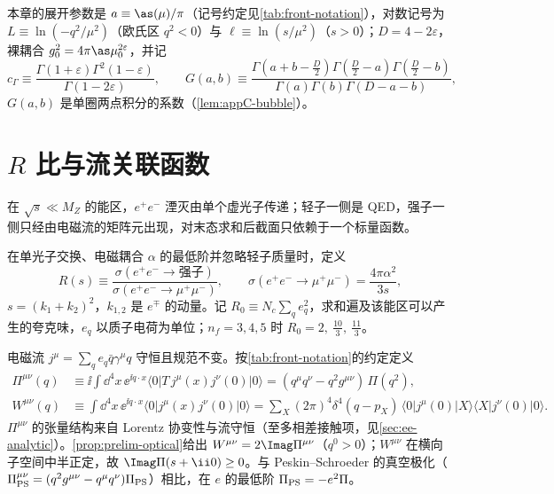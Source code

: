 本章的展开参数是 $a\equiv\as(\mu)/\pi$（记号约定见\cref{tab:front-notation}），对数记号为 $L\equiv\ln(-q^2/\mu^2)$（欧氏区 $q^2<0$）与 $\ell\equiv\ln(s/\mu^2)$（$s>0$）；$D=4-2\varepsilon$，裸耦合 $g_0^2=4\pi\as\mu_0^{2\varepsilon}$，并记
\begin{equation}\label{eq:ee-cGamma}
c_\Gamma\equiv\frac{\Gamma(1+\varepsilon)\Gamma^2(1-\varepsilon)}{\Gamma(1-2\varepsilon)},\qquad
G(a,b)\equiv\frac{\Gamma(a+b-\frac D2)\Gamma(\frac D2-a)\Gamma(\frac D2-b)}{\Gamma(a)\Gamma(b)\Gamma(D-a-b)} ,
\end{equation}
$G(a,b)$ 是单圈两点积分的系数（\cref{lem:appC-bubble}）。

\section{$R$ 比与流关联函数}\label{sec:ee-R}

在 $\sqrt s\ll M_Z$ 的能区，$e^+e^-$ 湮灭由单个虚光子传递；轻子一侧是 QED，强子一侧只经由电磁流的矩阵元出现，对末态求和后截面只依赖于一个标量函数。

\begin{definition}[$R$ 比]\label{def:ee-R}
在单光子交换、电磁耦合 $\alpha$ 的最低阶并忽略轻子质量时，定义
\begin{equation}\label{eq:ee-Rdef}
R(s)\equiv\frac{\sigma(e^+e^-\to\text{强子})}{\sigma(e^+e^-\to\mu^+\mu^-)},\qquad
\sigma(e^+e^-\to\mu^+\mu^-)=\frac{4\pi\alpha^2}{3s},
\end{equation}
$s=(k_1+k_2)^2$，$k_{1,2}$ 是 $e^\mp$ 的动量。记 $R_0\equiv N_c\sum_qe_q^2$，求和遍及该能区可以产生的夸克味，$e_q$ 以质子电荷为单位；$n_f=3,4,5$ 时 $R_0=2,\ \frac{10}3,\ \frac{11}3$。%
\end{definition}

电磁流 $j^\mu=\sum_qe_q\bar q\gamma^\mu q$ 守恒且规范不变。按\cref{tab:front-notation}的约定定义%
\begin{align}
\Pi^{\mu\nu}(q)&\equiv\ii\!\int\!\dd^4x\,\ee^{\ii q\cdot x}\langle0|T\,j^\mu(x)j^\nu(0)|0\rangle=(q^\mu q^\nu-q^2g^{\mu\nu})\,\Pi(q^2), \label{eq:ee-Pidef}\\
W^{\mu\nu}(q)&\equiv\int\!\dd^4x\,\ee^{\ii q\cdot x}\langle0|j^\mu(x)j^\nu(0)|0\rangle
=\sum_X(2\pi)^4\delta^4(q-p_X)\,\langle0|j^\mu(0)|X\rangle\langle X|j^\nu(0)|0\rangle . \label{eq:ee-Wdef}
\end{align}
$\Pi^{\mu\nu}$ 的张量结构来自 Lorentz 协变性与流守恒（至多相差接触项，见\allowbreak\cref{sec:ee-analytic}）。\cref{prop:prelim-optical}给出 $W^{\mu\nu}=2\Imag\Pi^{\mu\nu}$（$q^0>0$）；$W^{\mu\nu}$ 在横向子空间中半正定，故 $\Imag\Pi(s+\ii0)\ge0$。与 Peskin--Schroeder 的真空极化（$\Pi^{\mu\nu}_{\rm PS}=(q^2g^{\mu\nu}-q^\mu q^\nu)\Pi_{\rm PS}$）相比，在 $e$ 的最低阶 $\Pi_{\rm PS}=-e^2\Pi$。

